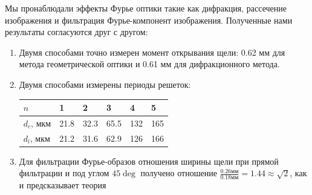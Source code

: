 \documentclass[a4paper,12pt]{article}
\begin{document}
Мы пронаблюдали эффекты Фурье оптики такие как дифракция, рассечение изображения и фильтрация Фурье-компонент изображения.
Полученные нами результаты согласуются друг с другом:
\begin{enumerate}
    \item Двумя способами точно измерен момент открывания щели: 0.62 мм для метода геометрической оптики и 0.61 мм для дифракционного метода.
    \item Двумя способами измерены периоды решеток:
    \begin{table}[h]
        \centering
        \begin{tabular}{|l|l|l|l|l|l|}
        \hline
        $n$        & 1    & 2    & 3    & 4   & 5   \\ \hline
        $d_c$, мкм & 21.8 & 32.3 & 65.5 & 132 & 165 \\ \hline
        $d_l$, мкм & 21.2 & 31.6 & 62.9 & 126 & 166 \\ \hline
        \end{tabular}
    \end{table}
    \item Для фильтрации Фурье-образов отношения ширины щели при прямой фильтрации и под углом $45\deg$ получено отношение $\frac{0.26\text{мм}}{0.18\text{мм}} = 1.44 \approx \sqrt{2}$, как и предсказывает теория
\end{enumerate}
\end{document}
